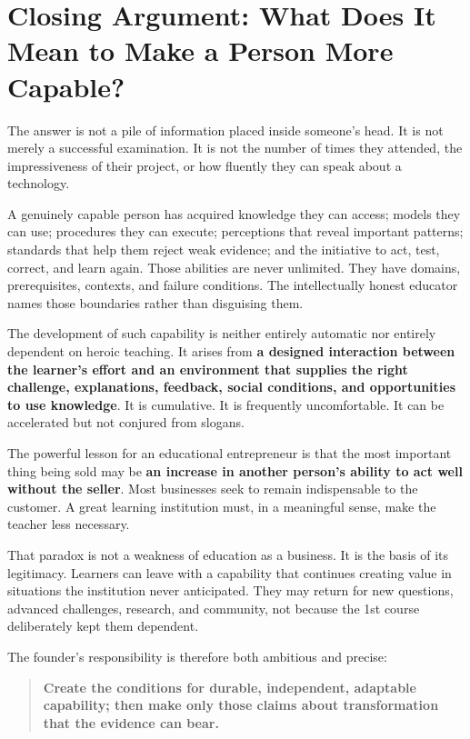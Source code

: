 \section*{Closing Argument: What Does It Mean to Make a Person More Capable?}

The answer is not a pile of information placed inside someone's head. It is not merely a successful examination. It is not the number of times they attended, the impressiveness of their project, or how fluently they can speak about a technology.

A genuinely capable person has acquired knowledge they can access; models they can use; procedures they can execute; perceptions that reveal important patterns; standards that help them reject weak evidence; and the initiative to act, test, correct, and learn again. Those abilities are never unlimited. They have domains, prerequisites, contexts, and failure conditions. The intellectually honest educator names those boundaries rather than disguising them.

The development of such capability is neither entirely automatic nor entirely dependent on heroic teaching. It arises from \textbf{a designed interaction between the learner's effort and an environment that supplies the right challenge, explanations, feedback, social conditions, and opportunities to use knowledge}. It is cumulative. It is frequently uncomfortable. It can be accelerated but not conjured from slogans.

The powerful lesson for an educational entrepreneur is that the most important thing being sold may be \textbf{an increase in another person's ability to act well without the seller}. Most businesses seek to remain indispensable to the customer. A great learning institution must, in a meaningful sense, make the teacher less necessary.

That paradox is not a weakness of education as a business. It is the basis of its legitimacy. Learners can leave with a capability that continues creating value in situations the institution never anticipated. They may return for new questions, advanced challenges, research, and community, not because the 1st course deliberately kept them dependent.

The founder's responsibility is therefore both ambitious and precise:

\begin{quote}
\textbf{Create the conditions for durable, independent, adaptable capability; then make only those claims about transformation that the evidence can bear.}
\end{quote}

